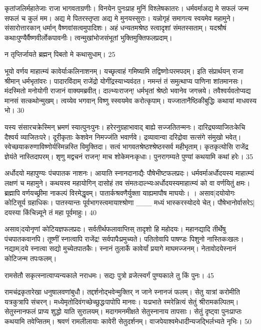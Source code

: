 कृतांजलिर्महातेजाः राजा भागवताग्रणीः।
विनयेन पुनःप्राह मुनिं विश्लेषकातरः।
धर्मवर्माअद्य मे सफलं जन्म सफलं च कुलं मम।
अद्य मे पितरस्तृप्ता अद्य मे मुनयस्सुराः।
यन्नोगृहं समागत्य स्वयमेव महामुने।
संसारोत्तारकान् धर्मान् वैष्णवांसत्वमुपादिशः।
अहं धन्यतमश्रेष्ठ स्त्वादृशां संमतस्सताम्।
यदश्रौषं कथाःपुण्यैर्वैष्णवीर्लोकपावनीः।
त्वन्मुखांभोजसंभूतां भुक्तिमुक्तिफलप्रदाम्।

न तृप्तिर्जायते ब्रह्मन् पिबतो मे कथासुधाम्।
25

भूयो वर्णय माहात्म्यं कावेर्याःकलिनाशनम्।
यच्छृत्वाहं गमिष्यामि तद्विष्णोःपरमपदम्।
इति संप्रार्थयन् राजा श्रीमान् धर्मभृतांवरः।
पादारविंदाम् राजेंद्रो योगींद्रस्याभ्यवंदत।
नमन्तं तं समुत्थाप्य पाणिना शांतमानसः।
मंदस्मितो मनोयोगी राजानं वाक्यमब्रवीत्।
दाल्भ्यःराजन्! धर्मभृतां श्रेष्ठो भवानेव जगत्त्रये।
तवैश्वर्यवतोप्यद्य मानसं सत्कथोन्मुखम्।
त्वय्येव भगवान् विष्णु स्स्वयमेव करोत्कृपाम्।
यज्जातानैष्ठिकीबुद्धिः कथायां माधवस्य भो।
30

यस्य संसारचक्रेस्मिन् भ्रमणं स्यात्पुनःपुनः।
हरेरनुग्रहाभावाद् बाह्ये सज्जतितन्मनः।
दारिद्र्यव्याजितःकेचि दैश्वर्य व्याजितःपरे।
दूरीकृताः केशवेन निमज्जंति भवार्णवे।
द्रव्यावान्वा दरिद्रोवा सत्संगे संमुखो भवेत्।
स्वेच्छयाकरुणाविष्णोर्यस्मिन्नस्ति विमुक्तिदा।
सत्वं भागवतश्रेष्ठश्श्रेष्ठस्सर्व महीभृताम्।
कृतकृत्योसि राजेंद्र ज्ञेयंते नास्तिदापरम्।
शृणु मद्वचनं राजन्! माच शोकेमनःकृधाः।
पुनरागम्यते पुण्यां कथयामि कथां हरेः।
35


अर्धोदयो महापुण्यः पंचपातक नाशनः।
आयाति स्नानदानाद्यैः पौषेभीष्टफलप्रदः।
धर्मवर्माअर्धोदयस्य माहात्म्यं लक्षणं च महामुने।
कथयस्व महायोगिन् दासोहं तव संमतःदाल्भ्यःअर्धोदयस्यमाहात्म्यं को वा वर्णयितुं क्षमः।
ब्रह्मापि वर्णयच्छ्रीमा नाकल्पं विरमेद्धृवम्।
पातार्कश्रवणैर्युक्ता याह्यमापौष माघयोः।
।
असाव|दयोयोगः कोटिसूर्य ग्रहाधिकः।
पातस्यान्तः पूर्वभागस्त्वमायाश्श्रोणा
___ मध्यं भास्करस्योदये चेत्।
पौषेभानोर्वासरेऽ|दयस्या किंचिन्न्यूने
तं महा पूर्वमाहुः।
40

असाव|दयोनृणां कोटियज्ञफलप्रदः।
सर्वतीर्थफलावाप्तिस् तादृशो हि महोदयः।
महानद्यादि तीर्थेषु पंचपातकवानपि।
तूष्णीं स्नात्वापि राजेंद्र! सर्वपापैःप्रमुच्यते।
पतितोवापि पाषण्डः पिशुनो नास्तिकःखलः।
नद्याम|दये स्नात्वा सद्यो मुच्येतपातकैः।
स्नानं तुलार्के कावेर्यां प्रयागे माघमज्जनम्।
नेतावोदयेस्नानं कोटिजन्म तपःफलम्।

रामसेतौ सकृत्स्नात्वाप्यन्यकाले नराधमः।
सद्यः पुत्रो व्रजेत्स्वर्गं पुण्यकाले तु किं पुनः।
45

रामचंद्रकृतारेखा धनुषालवणांबुधौ।
तद्दर्शनोद्भवेन्मुक्तिर् न जाने स्नानजं फलम्।
सेतु यात्रां करोमीति यत्रकुत्रापि संचरन्।
मध्येमृतोदिवंगच्छेच्छुद्धःपापोपि मानवः।
यःप्रभाते स्मरेन्नित्यं सेतुं श्रीरामकल्पितम्।
सेतुस्नानफलं प्राप्य शुद्धो याति सुरालयम्।
मदागमनमीक्षते सेतुस्नानाय तापसाः।
सेतुं दृष्ट्वा पुनःप्राप्तः कथयामि तवेप्सितम्।
श्रवणं रामलीलायाः कावेरी सेतुदर्शनम्।
वाजपेयाश्वमेधादीन्यजद्भिर्लभ्यते नृभिः।
50

